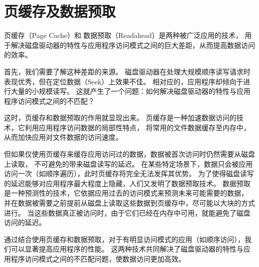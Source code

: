 \section{页缓存及数据预取}
页缓存（Page Cache）\parencite{tanenbaum2014modern}\parencite{ostep}\parencite{bovet2005understanding}和
数据预取（Readahead）\parencite{readahead}\parencite{sequential_prefetching}是两种被广泛应用的技术，
用于解决磁盘驱动器的特性与应用程序访问模式之间的巨大差距，从而提高数据访问的效率。

首先，我们需要了解这种差距的来源。
磁盘驱动器在处理大规模顺序读写请求时表现优秀，但在定位数据（Seek）上效果不佳。
相对应的，应用程序却倾向于进行大量的小规模读写。\parencite{disk_performance}\parencite{disk_io_behavior}
这就产生了一个问题：如何解决磁盘驱动器的特性与应用程序访问模式之间的不匹配？

这时，页缓存和数据预取的作用就显现出来。
页缓存是一种加速数据访问的技术，它利用应用程序访问数据的局部性特点，
将常用的文件数据缓存至内存中，从而加快应用对文件数据的访问速度。

但如果仅使用页缓存来缓存应用访问过的数据，数据被首次访问时仍然需要从磁盘上读取，
不可避免的带来磁盘读写的延迟。
在某些特定场景下，数据只会被应用访问一次（如顺序遍历），此时页缓存将完全无法发挥其优势。
为了使得磁盘读写的延迟能够对应用程序最大程度上隐藏，人们又发明了数据预取技术。
数据预取是一种预测性的技术，它依据应用过去的访问模式来预测未来可能需要的数据，
并在数据被需要之前提前从磁盘上读取这些数据到页缓存中，尽可能以大块的方式进行。
当这些数据真正被访问时，由于它们已经在内存中可用，就能避免了磁盘访问的延迟。

通过结合使用页缓存和数据预取，对于有明显访问模式的应用（如顺序访问），我们可以显著提高应用程序的性能。
这两种技术共同解决了磁盘驱动器的特性与应用程序访问模式之间的不匹配问题，使数据访问更加高效。


